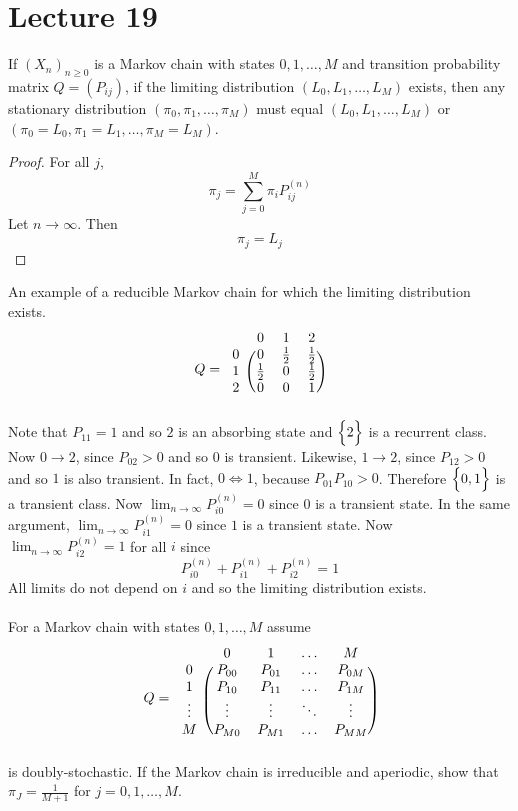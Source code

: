 \documentclass[12pt]{article}
\begin{document}
\section{Lecture 19} 
\begin{theorem} If $(X_n)_{n\geq0}$ is a Markov chain with states $0,1,\dots,M$ and transition probability matrix $Q = (P_{ij})$, if the limiting distribution $(L_0,L_1,\dots,L_M)$ exists, then any stationary distribution $(\pi_0,\pi_1,\dots,\pi_M)$ must equal $(L_0,L_1,\dots,L_M)$ or $(\pi_0 = L_0, \pi_1 = L_1,\dots,\pi_M = L_M)$. \end{theorem} 
\begin{proof} For all $j$, $$ \pi_j = \sum_{j=0}^M \pi_i P_{ij}^{(n)} $$ Let $n\to\infty$. Then $$ \pi_j = L_j $$ \end{proof} 
An example of a reducible Markov chain for which the limiting distribution exists. $$Q = \begin{blockarray}{cccc}
&0&1&2 \\
\begin{block}{c(ccc)}
0 & 0 & \frac{1}{2} & \frac{1}{2} \\
1 & \frac{1}{2} & 0 & \frac{1}{2} \\ 
2 & 0 & 0 & 1  \\  \end{block} \end{blockarray} $$
Note that $P_{11} = 1$ and so $2$ is an absorbing state and $\Big\{ 2 \Big\}$ is a recurrent class. Now $0\to2$, since $P_{02} > 0$ and so $0$ is transient. Likewise, $1\to2$, since $P_{12} > 0$ and so $1$ is also transient. In fact, $0 \iff 1$, because $P_{01}P_{10} > 0$. Therefore $\Big\{ 0,1 \Big\}$ is a transient class. Now $\lim_{n\to\infty} P_{i0}^{(n)} = 0$ since $0$ is a transient state. In the same argument, $\lim_{n\to\infty} P_{i1}^{(n)} = 0$ since $1$ is a transient state. Now $\lim_{n\to\infty} P_{i2}^{(n)} = 1$ for all $i$ since $$P_{i0}^{(n)} + P_{i1}^{(n)} + P_{i2}^{(n)} = 1$$ All limits do not depend on $i$ and so the limiting distribution exists. \\~\\ 
For a Markov chain with states $0,1,\dots,M$ assume $$ Q = \begin{blockarray}{ccccc}
&0&1&\dots&M \\
\begin{block}{c(cccc)}
0 & P_{00} & P_{01} & \dots & P_{0M} \\
1 & P_{10} & P_{11} & \dots & P_{1M}  \\
\vdots  &\vdots & \vdots & \ddots & \vdots \\ 
M & P_{M0} & P_{M1} & \dots & P_{MM} \\ \end{block} \end{blockarray} $$ is doubly-stochastic. If the Markov chain is irreducible and aperiodic, show that $\pi_J = \frac{1}{M+1} $ for $j = 0,1,\dots,M$. \\
\end{document}
